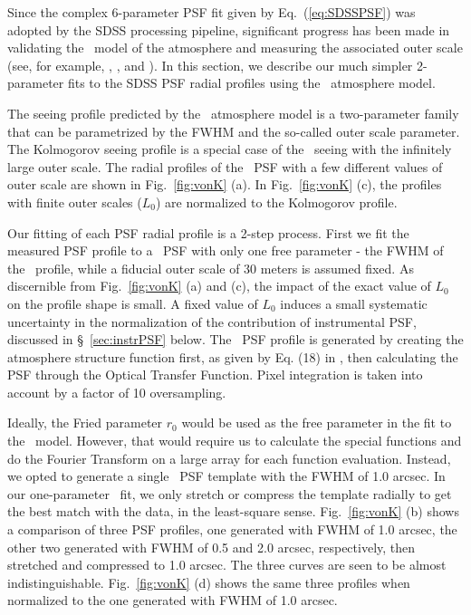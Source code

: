 

Since the complex 6-parameter PSF fit given by Eq.~(\ref{eq:SDSSPSF}) was adopted by 
the SDSS processing pipeline, significant progress has been made in validating the 
\vk~model of the atmosphere and measuring the associated outer
scale (see, for example, \citealt{Tokovinin2002}, \citealt{Boccas2004}, and \citealt{MartinezMessenger}).
In this section, we describe our much simpler 2-parameter fits to the SDSS PSF
radial profiles using the \vk~atmosphere model.

The seeing profile predicted by the \vk~atmosphere model is a two-parameter
family that can be parametrized by the FWHM and the so-called outer scale
parameter. The Kolmogorov seeing profile is a special case of the 
\vk~seeing with the infinitely large outer scale. The radial profiles of the 
\vk~PSF with a few different values of outer scale are shown in Fig.~\ref{fig:vonK} (a). 
In Fig.~\ref{fig:vonK} (c), the profiles with finite outer scales
($L_0$) are normalized to the Kolmogorov profile.

Our fitting of each PSF radial profile is a 2-step process. First we fit the
measured PSF profile to a \vk~PSF with only one free parameter -
the FWHM of the \vk~profile, while a fiducial outer scale of 30 meters
is assumed fixed. As discernible from Fig.~\ref{fig:vonK} (a) and (c), the impact of the exact
value of $L_0$ on the profile shape is small. A fixed value of $L_0$ induces a small 
systematic uncertainty in the normalization of the contribution of instrumental PSF, 
discussed in \S~\ref{sec:instrPSF}  below. The \vk~PSF profile is generated by creating 
the atmosphere structure function first, as given by Eq. (18) in \cite{Tokovinin2002},
then calculating the PSF through the Optical Transfer Function. 
Pixel integration is taken into account by a factor of 10 oversampling.

Ideally, the Fried parameter $r_0$ would be used as the free
parameter in the fit to the \vk~model. However, 
that would require us to calculate the special functions and do the
Fourier Transform on a large array for each function evaluation.
Instead, we opted to generate a single \vk~PSF template with the FWHM of 
1.0 arcsec. In our one-parameter \vk~fit, we only stretch or compress
the template radially to get the best match with the data, in the
least-square sense.
Fig.~\ref{fig:vonK} (b) shows a comparison of three PSF profiles,
one generated with FWHM of 1.0 arcsec, the other two generated with
FWHM of 0.5 and 2.0 arcsec, respectively, then stretched and
compressed to 1.0 arcsec. The three curves are seen to be almost
indistinguishable.
Fig.~\ref{fig:vonK} (d) shows the same three profiles when normalized
to the one generated with FWHM of 1.0 arcsec.

